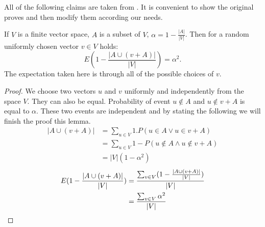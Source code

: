 All of the following claims are taken from \cite{linear-hash-functions}. It is convenient to show the original proves and then modify them according our needs.

\begin{lemma}
\label{lemma-choose-random-vector}
If $V$ is a finite vector space, $A$ is a subset of $V$, $\alpha = 1 - \frac{|A|}{|V|}$. Then for a random uniformly chosen vector $v \in V$ holds:
\begin{displaymath}
E (1 - \frac{|A \cup (v + A)|}{|V|}) = \alpha^2 \textit{.}
\end{displaymath}
The expectation taken here is through all of the possible choices of $v$.
\end{lemma}
\begin{proof}
We choose two vectors $u$ and $v$ uniformly and independently from the space $V$. They can also be equal. Probability of event $u \notin A$ and $u \notin v + A$ is equal to $\alpha$. These two events are independent and by stating the following we will finish the proof this lemma.
\begin{displaymath}
\begin{split}
|A \cup (v + A)| 
	& = \sum_{u \in V} 1 . P(u \in A \vee u \in v + A) \\ 
	& = \sum_{u \in V} 1 - P(u \notin A \wedge u \notin v + A) \\ 
	& = |V| (1 - \alpha ^ 2)
\end{split}
\end{displaymath}
\begin{displaymath}
\begin{split}
E (1 - \frac{|A \cup (v + A)|}{|V|}) 
	& = \frac{\sum\displaylimits_{v \in V}(1 - \frac{|A \cup (v + A)|}{|V|})}{|V|} \\
	& = \frac{\sum\displaylimits_{v \in V}\alpha ^ 2}{|V|}
\end{split}
\end{displaymath}
\end{proof}

